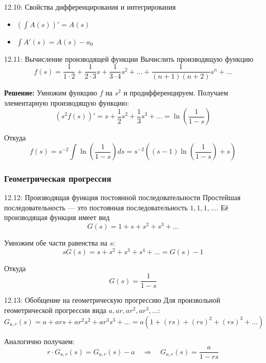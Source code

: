\documentclass[a4paper,12pt]{article}
\begin{document}
	\begin{propertybox}{12.10: Свойства дифференцирования и интегрирования}
		\begin{itemize}
			\item \(\left( \int A(s) \right)' = A(s)\)
			\item \(\int A'(s) = A(s) - a_0\)
		\end{itemize}
	\end{propertybox}
	
	\begin{examplebox}{12.11: Вычисление производящей функции}
		Вычислить производящую функцию
		\[ f(s) = \frac{1}{1\cdot2} + \frac{1}{2\cdot3} s + \frac{1}{3\cdot4} s^2 + \dots + \frac{1}{(n+1)(n+2)} s^n + \dots \]
		
		\textbf{Решение:} Умножим функцию \(f\) на \(s^2\) и продифференцируем. Получаем элементарную производящую функцию:
		\[ (s^2 f(s))' = s + \frac{1}{2} s^2 + \frac{1}{3} s^3 + \dots = \ln\left(\frac{1}{1-s}\right) \]
		
		Откуда
		\[ f(s) = s^{-2} \int \ln\left(\frac{1}{1-s}\right) ds = s^{-2}\left((s-1)\ln\left(\frac{1}{1-s}\right) + s\right) \]
	\end{examplebox}
	
	\subsubsection{Геометрическая прогрессия}
	
	\begin{definitionbox}{12.12: Производящая функция постоянной последовательности}
		Простейшая последовательность — это постоянная последовательность \(1, 1, 1, \dots\). Её производящая функция имеет вид
		\[ G(s) = 1 + s + s^2 + s^3 + \dots \]
		
		Умножим обе части равенства на \(s\):
		\[ sG(s) = s + s^2 + s^3 + s^4 + \dots = G(s) - 1 \]
		
		Откуда
		\[ G(s) = \frac{1}{1-s} \]
	\end{definitionbox}
	
	\begin{corollarybox}{12.13: Обобщение на геометрическую прогрессию}
		Для произвольной геометрической прогрессии вида \(a, ar, ar^2, ar^3, \dots\):
		\[ G_{a,r}(s) = a + ar s + ar^2 s^2 + ar^3 s^3 + \dots = a(1 + (rs) + (rs)^2 + (rs)^3 + \dots) \]
		
		Аналогично получаем:
		\[ r \cdot G_{a,r}(s) = G_{a,r}(s) - a \quad\Rightarrow\quad G_{a,r}(s) = \frac{a}{1-rs} \]
	\end{corollarybox}
	
\end{document}
